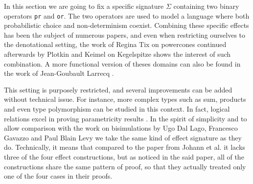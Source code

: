 In this section we are going to fix a specific signature $\Sigma$
containing two binary operators \texttt{pr} and \texttt{or}. The two
operators are used to model a language where both probabilistic choice 
and non-determinism coexist. Combining these specific effects has been 
the subject of numerous papers, and even when restricting ourselves to the 
denotational setting, the work of Regina Tix on powercones \cite{tix2009semantic} 
continued afterwards by Plotkin and Keimel \cite{KeimelP2016} on Kegelspitze
shows the interest of such combination.
A more functional version of theses domains can also be found in the work of Jean-Goubault Larrecq 
\cite{JGL-mscs16}.


This setting is purposely restricted, and several improvements can 
be added without technical issue. For instance, more complex types 
such as sum, products and even type polymorphism can be studied 
in this context. In fact, logical relations excel in proving parametricity 
results \cite{wadler1989theorems}.
In the spirit of simplicity 
and to allow comparison with the work on bisimulations by
Ugo Dal Lago, Francesco Gavazzo and Paul Blain Levy
\cite{Ugo2017} we take the same kind of effect signature 
as they do. Technically, it means that compared to 
the paper from Johann et al. \cite{gom} it lacks 
three of the four effect constructions, but as noticed 
in the said paper, all of the constructions share the
same pattern of proof, so that they actually treated 
only one of the four cases in their proofs.

